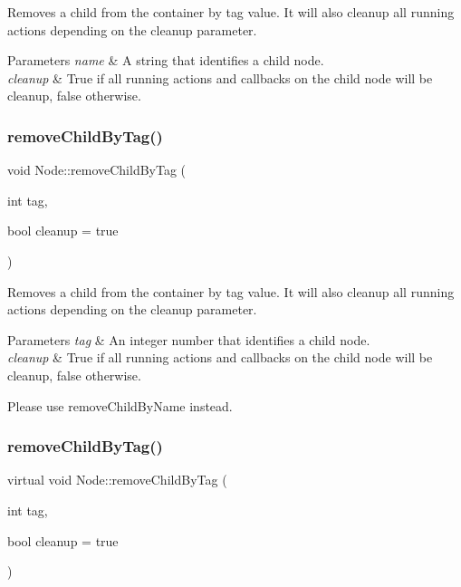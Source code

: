 Removes a child from the container by tag value. It will also cleanup all running actions depending on the cleanup parameter.


\begin{DoxyParams}{Parameters}
{\em name} & A string that identifies a child node. \\
\hline
{\em cleanup} & True if all running actions and callbacks on the child node will be cleanup, false otherwise. \\
\hline
\end{DoxyParams}
\mbox{\label{classNode_ae2e53ef64e2252d07304429889278864}} 
\subsubsection{\texorpdfstring{remove\+Child\+By\+Tag()}{removeChildByTag()}\hspace{0.1cm}{\footnotesize\ttfamily [1/2]}}
{\footnotesize\ttfamily void Node\+::remove\+Child\+By\+Tag (\begin{DoxyParamCaption}\item[{int}]{tag,  }\item[{bool}]{cleanup = {\ttfamily true} }\end{DoxyParamCaption})\hspace{0.3cm}{\ttfamily [virtual]}}

Removes a child from the container by tag value. It will also cleanup all running actions depending on the cleanup parameter.


\begin{DoxyParams}{Parameters}
{\em tag} & An integer number that identifies a child node. \\
\hline
{\em cleanup} & True if all running actions and callbacks on the child node will be cleanup, false otherwise.\\
\hline
\end{DoxyParams}
Please use {\ttfamily remove\+Child\+By\+Name} instead. \mbox{\label{classNode_a7d2e9aae23d04f4355eadd5d38bc6200}} 
\subsubsection{\texorpdfstring{remove\+Child\+By\+Tag()}{removeChildByTag()}\hspace{0.1cm}{\footnotesize\ttfamily [2/2]}}
{\footnotesize\ttfamily virtual void Node\+::remove\+Child\+By\+Tag (\begin{DoxyParamCaption}\item[{int}]{tag,  }\item[{bool}]{cleanup = {\ttfamily true} }\end{DoxyParamCaption})\hspace{0.3cm}{\ttfamily [virtual]}}

